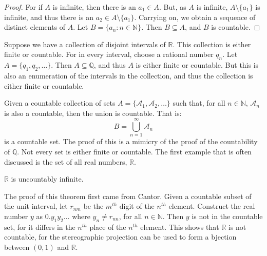 \documentclass[crop=false,class=book,oneside]{standalone}
\begin{document}
        \begin{proof}
            For if $A$ is infinite, then there is an
            $a_{1}\in{A}$. But, as $A$ is infinite,
            $A\setminus\{a_{1}\}$ is infinite, and thus there
            is an $a_{2}\in{A}\setminus\{a_{1}\}$. Carrying on,
            we obtain a sequence of distinct elements of $A$.
            Let $B=\{a_{n}:n\in\mathbb{N}\}$. Then
            $B\subseteq{A}$, and $B$ is countable.
        \end{proof}
        \begin{example}
            Suppose we have a collection of disjoint intervals
            of $\mathbb{R}$. This collection is either finite
            or countable. For in every interval, choose a
            rational number $q_{n}$. Let
            $A=\{q_{1},q_{2},\hdots\}$. Then
            $A\subseteq\mathbb{Q}$, and thus $A$ is either
            finite or countable. But this is also an enumeration
            of the intervals in the collection, and thus the
            collection is either finite or countable.
        \end{example}
        Given a countable collection of sets
        $A=\{\mathcal{A}_{1},\mathcal{A}_{2},\hdots\}$ such
        that, for all $n\in\mathbb{N}$, $\mathcal{A}_{n}$ is
        also a countable, then the union is countable.
        That is:
        \begin{equation}
            B=\bigcup_{n=1}^{\infty}\mathcal{A}_{n}
        \end{equation}
        is a countable set. The proof of this is a mimicry of
        the proof of the countability of $\mathbb{Q}$. Not
        every set is either finite or countable. The first
        example that is often discussed is the set of all
        real numbers, $\mathbb{R}$.
        \begin{theorem}
            $\mathbb{R}$ is uncountably infinite.
        \end{theorem}
        The proof of this theorem first came from Cantor.
        Given a countable subset of the unit interval, let
        $r_{nm}$ be the $m^{th}$ digit of the $n^{th}$ element.
        Construct the real number $y$ as
        $0.y_{1}y_{2}\hdots$ where $y_{n}\ne{r}_{nn}$, for
        all $n\in\mathbb{N}$. Then $y$ is not in the countable
        set, for it differs in the $n^{th}$ place of the
        $n^{th}$ element. This shows that $\mathbb{R}$ is
        not countable, for the stereographic projection can be
        used to form a bjection between $(0,1)$ and $\mathbb{R}$.
\end{document}
